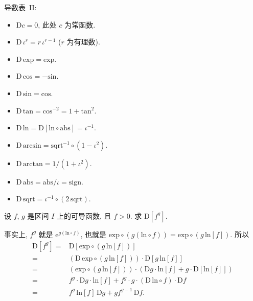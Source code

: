 \begin{theorem}
    导数表~II:
    \begin{itemize}
        \item $\mathrm{D} c = 0$,
              此处 $c$ 为常函数.
        \item $\mathrm{D}\, \iota^r = r \, \iota^{r - 1}$
              ($r$ 为有理数).
        \item $\mathrm{D}\, \mathrm{exp} = \mathrm{exp}$.
        \item $\mathrm{D}\, \mathrm{cos} = -\mathrm{sin}$.
        \item $\mathrm{D}\, \mathrm{sin} = \mathrm{cos}$.
        \item $\mathrm{D}\, \mathrm{tan} = \mathrm{cos}^{-2} = 1 + \mathrm{tan}^2$.
        \item $\mathrm{D}\, \mathrm{ln} = \mathrm{D} [\mathrm{ln} \circ \mathrm{abs}] = \iota^{-1}$.
        \item $\mathrm{D}\, \mathrm{arcsin} = \mathrm{sqrt}^{-1} \circ (1 - \iota^2)$.
        \item $\mathrm{D}\, \mathrm{arctan} = 1/(1 + \iota^2)$.
        \item $\mathrm{D}\, \mathrm{abs} = \mathrm{abs}/\iota = \mathrm{sign}$.
        \item $\mathrm{D}\, \mathrm{sqrt} = \iota^{-1} \circ (2\,\mathrm{sqrt})$.
    \end{itemize}
\end{theorem}

\begin{example}
    设 $f$, $g$ 是区间 $I$ 上的可导函数, 且 $f > 0$.
    求 $\mathrm{D}[f^g]$.

    事实上, $f^g$ 就是 $\mathrm{e}^{g(\mathrm{ln} \circ f)}$,
    也就是
    $\mathrm{exp} \circ (g(\mathrm{ln} \circ f)) = \mathrm{exp} \circ (g\, \mathrm{ln}[f])$.
    所以
    \begin{align*}
        \mathrm{D}[f^g]
        = {} & \mathrm{D}[\mathrm{exp} \circ (g\, \mathrm{ln}[f])]                    \\
        = {} & ({\mathrm{D}\,\mathrm{exp}} \circ (g\, \mathrm{ln}[f]))
        \cdot \mathrm{D}[g\, \mathrm{ln}[f]]                                          \\
        = {} & (\mathrm{exp} \circ (g\, \mathrm{ln}[f]))
        \cdot (\mathrm{D}g \cdot \mathrm{ln}[f] + g \cdot \mathrm{D}[\mathrm{ln}[f]]) \\
        = {} & f^g \cdot \mathrm{D}g \cdot \mathrm{ln}[f]
        + f^g \cdot g \cdot (\mathrm{D}\,\mathrm{ln} \circ f) \cdot \mathrm{D}f       \\
        = {} & f^g \, \mathrm{ln}[f] \, \mathrm{D}g
        + g f^{g - 1}\,\mathrm{D}f.
    \end{align*}
\end{example}

